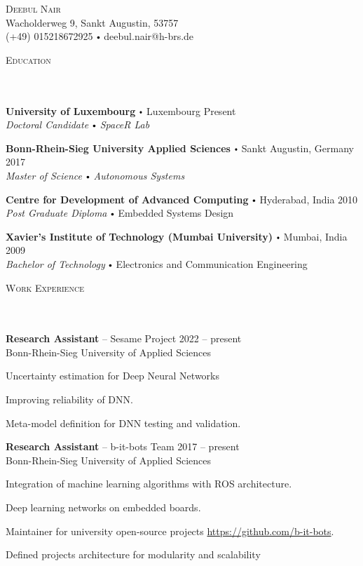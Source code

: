 \documentclass{article}
\newcommand{\contact}[3]{
\vspace*{5pt}
\begin{center}
{\Huge \scshape {#1}}\\
\vspace{3pt}
#2 
\vspace{2pt}
#3
\end{center}
\vspace*{-8pt}
}
\newcommand{\header}[1]{{
\hspace*{-15pt}\vspace*{6pt} \textsc{#1}} \vspace*{-6pt} 
\lineunder
}
\newcommand{\lineunder}{
\vspace*{-8pt} \\ \hspace*{-18pt} 
\hrulefill \\
}
\newcommand{\content}{
\vspace*{2pt}%
}
\newcommand{\school}[4]{
\textbf{#1} \labelitemi #2 \hfill #3 \\ #4 \vspace*{5pt}
}
\newcommand{\employer}[4]{{
\vspace*{2pt}%
\textbf{#1} #2 \hfill #3\\ #4 \vspace*{2pt}}
}
\renewcommand{\labelitemi}{
$\vcenter{\hbox{\tiny$\bullet$}}$\hspace*{3pt}
}
\renewcommand{\labelitemii}{
$\vcenter{\hbox{\tiny$\bullet$}}$\hspace*{-3pt}
}
\newenvironment{bullet-list-minor}{
\begin{list}{\labelitemii}{\setlength\leftmargin{15pt} 
\topsep 0pt \itemsep -2pt}}{\vspace*{4pt}\end{list}
}
\begin{document}
\small
\smallskip
\vspace*{-44pt}

\contact{Deebul Nair}
{Wacholderweg 9, Sankt Augustin, 53757\\}
{(+49) 015218672925 \labelitemi deebul.nair@h-brs.de}
\vspace{15pt}

\vspace*{4pt}%

\vspace*{4pt}%
\header{Education}
    \school{University of Luxembourg}{Luxembourg}{Present}
    {\textit{Doctoral Candidate \labelitemi SpaceR Lab}}
    
    \school{Bonn-Rhein-Sieg University Applied Sciences}{Sankt Augustin, Germany}{ 2017}
    {\textit{Master of Science \labelitemi Autonomous Systems}}
    
    \school{Centre for Development of Advanced Computing}{Hyderabad, India}{2010}
    {\textit{Post Graduate Diploma} \labelitemi Embedded Systems Design }

    \school{Xavier's Institute of Technology (Mumbai University)}{Mumbai, India}{2009}
    {\textit{Bachelor of Technology} \labelitemi Electronics and Communication Engineering }

\vspace*{4pt}%
\header{Work Experience}
    \employer{Research Assistant}{-- Sesame Project}{2022 -- present}
    {Bonn-Rhein-Sieg University of Applied Sciences}
	\begin{bullet-list-minor}
	\item Uncertainty estimation for Deep Neural Networks
    \item Improving reliability of DNN.
    \item Meta-model definition for DNN testing and validation.
    \end{bullet-list-minor}
    
    \employer{Research Assistant}{-- b-it-bots Team}{2017 -- present}
    {Bonn-Rhein-Sieg University of Applied Sciences}
	\begin{bullet-list-minor}
	\item Integration of machine learning algorithms with ROS architecture.
    \item Deep learning networks on embedded boards.
    \item Maintainer for university open-source projects \url{https://github.com/b-it-bots}.
	\item Defined projects architecture for modularity and scalability
    \end{bullet-list-minor}
    
\end{document}
